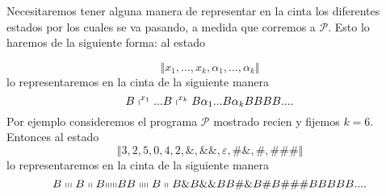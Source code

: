 \begin{frame}
	Necesitaremos tener alguna manera de representar en la cinta los diferentes
	estados por los cuales se va pasando, a medida que corremos a $\mathcal{P}$.
	Esto lo haremos de la siguiente forma: al estado

	\begin{equation*}
	\left\Vert x_{1},...,x_{k},\alpha _{1},...,\alpha _{k}\right\Vert
	\end{equation*}%
	lo representaremos en la cinta de la siguiente manera%
	\begin{equation*}
	B\shortmid ^{x_{1}}...B\shortmid ^{x_{k}}B\alpha _{1}...B\alpha _{k}BBBB....
	\end{equation*}%
	Por ejemplo consideremos el programa $\mathcal{P}$ mostrado recien y fijemos
	$k=6$. Entonces al estado%
	\begin{equation*}
	\left\Vert 3,2,5,0,4,2,\&,\&\&,\varepsilon ,\#\&,\#,\#\#\#\right\Vert
	\end{equation*}%
	lo representaremos en la cinta de la siguiente manera%
	\begin{equation*}
	B\shortmid \shortmid \shortmid B\shortmid \shortmid B\mathrm{\shortmid
	\shortmid \shortmid \shortmid \shortmid }BB\shortmid \shortmid \shortmid
	\shortmid B\shortmid \shortmid B\&B\&\&BB\#\&B\#B\#\#\#BBBBB....
	\end{equation*}%
\end{frame}

